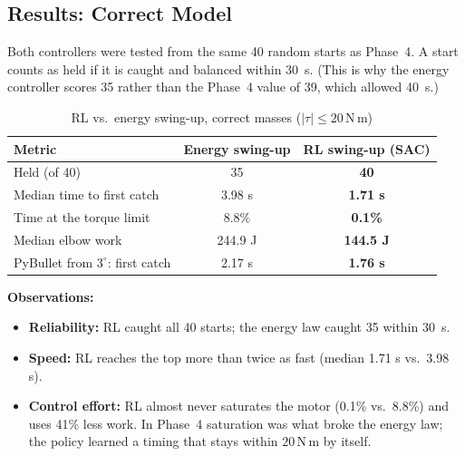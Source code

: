 \documentclass[12pt,a4paper]{article}
\newcommand{\Nm}{\,\mathrm{N\,m}}
\begin{document}
\subsection{Results: Correct Model}
Both controllers were tested from the same 40 random starts as Phase~4. A start counts as held if it is caught and balanced within 30~s. (This is why the energy controller scores 35 rather than the Phase~4 value of 39, which allowed 40~s.)
\begin{table}[H]
\centering
\caption{RL vs.\ energy swing-up, correct masses ($|\tau|\le20\Nm$)}
\label{tab:rlnom}
\begin{tabular}{|l|c|c|}
\hline
Metric & Energy swing-up & RL swing-up (SAC)\\ \hline
Held (of 40) & 35 & \textbf{40}\\
Median time to first catch & 3.98 s & \textbf{1.71 s}\\
Time at the torque limit & 8.8\% & \textbf{0.1\%}\\
Median elbow work & 244.9 J & \textbf{144.5 J}\\
PyBullet from $3^\circ$: first catch & 2.17 s & \textbf{1.76 s}\\ \hline
\end{tabular}
\end{table}
\textbf{Observations:}
\begin{itemize}
\item \textbf{Reliability:} RL caught all 40 starts; the energy law caught 35 within 30~s.
\item \textbf{Speed:} RL reaches the top more than twice as fast (median 1.71 s vs.\ 3.98 s).
\item \textbf{Control effort:} RL almost never saturates the motor (0.1\% vs.\ 8.8\%) and uses 41\% less work. In Phase~4 saturation was what broke the energy law; the policy learned a timing that stays within $20\Nm$ by itself.
\end{itemize}
\end{document}
